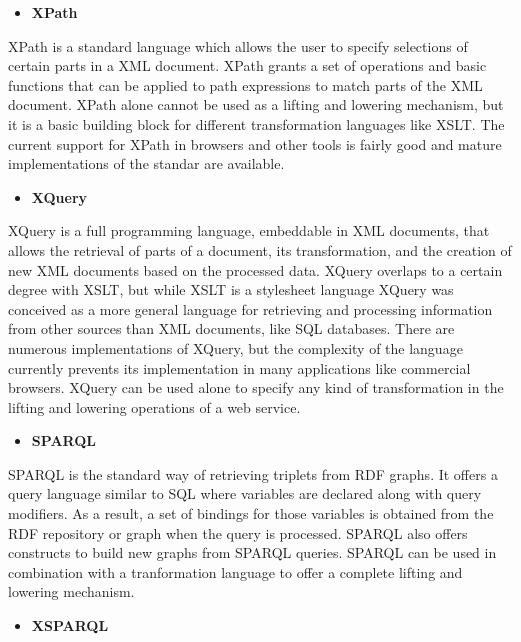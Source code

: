 \begin{itemize}
\item \bf{XPath}
\end{itemize}

XPath is a standard language which allows the user to specify selections of certain parts in a XML document. XPath grants a set of operations and basic functions that can be applied to path expressions to match parts of the XML document. XPath alone cannot be used as a lifting and lowering mechanism, but it is a basic building block for different transformation languages like XSLT. The current support for XPath in browsers and other tools is fairly good and mature implementations of the standar are available.

\begin{itemize}
\item \bf{XQuery}
\end{itemize}

XQuery is a full programming language, embeddable in XML documents, that allows the retrieval of parts of a document, its transformation, and the creation of new XML documents based on the processed data. XQuery overlaps to a certain degree with XSLT, but while XSLT is a stylesheet language XQuery was conceived as a more general language for retrieving and processing information from other sources than XML documents, like SQL databases. There are numerous implementations of XQuery, but the complexity of the language currently prevents its implementation in many applications like commercial browsers. XQuery can be used alone to specify any kind of transformation in the lifting and lowering operations of a web service.

\begin{itemize}
\item \bf{SPARQL}
\end{itemize}

SPARQL is the standard way of retrieving triplets from RDF graphs. It offers a query language similar to SQL where variables are declared along with query modifiers. As a result, a set of bindings for those variables is obtained from the RDF repository or graph when the query is processed. SPARQL also offers constructs to build new graphs from SPARQL queries. SPARQL can be used in combination with a tranformation language to offer a complete lifting and lowering mechanism.

\begin{itemize}
\item \bf{XSPARQL}
\end{itemize}

